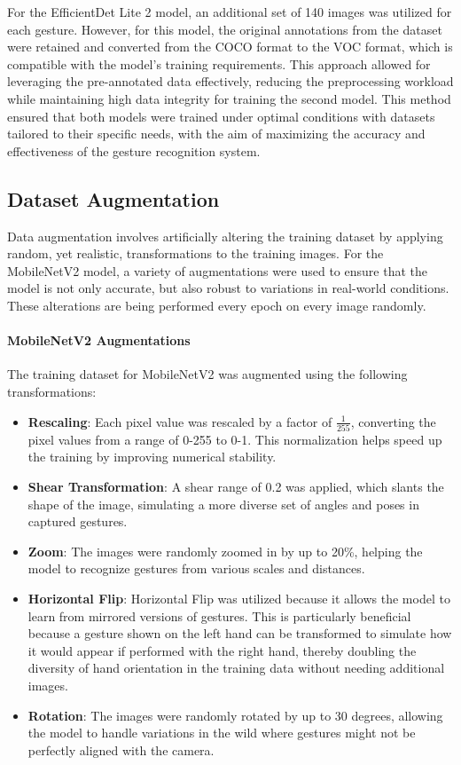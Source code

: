For the EfficientDet Lite 2 model, an additional set of 140 images was utilized for each gesture. However, for this model, the original annotations from the dataset were retained and converted from the COCO format to the VOC format, which is compatible with the model's training requirements. This approach allowed for leveraging the pre-annotated data effectively, reducing the preprocessing workload while maintaining high data integrity for training the second model. This method ensured that both models were trained under optimal conditions with datasets tailored to their specific needs, with the aim of maximizing the accuracy and effectiveness of the gesture recognition system.


\subsection{Dataset Augmentation}
Data augmentation involves artificially altering the training dataset by applying random, yet realistic, transformations to the training images. For the MobileNetV2 model, a variety of augmentations were used to ensure that the model is not only accurate, but also robust to variations in real-world conditions. These alterations are being performed every epoch on every image randomly.

\paragraph{MobileNetV2 Augmentations}
The training dataset for MobileNetV2 was augmented using the following transformations:
\begin{itemize}
    \item \textbf{Rescaling}: Each pixel value was rescaled by a factor of \(\frac{1}{255}\), converting the pixel values from a range of 0-255 to 0-1. This normalization helps speed up the training by improving numerical stability.
    \item \textbf{Shear Transformation}: A shear range of 0.2 was applied, which slants the shape of the image, simulating a more diverse set of angles and poses in captured gestures.
    \item \textbf{Zoom}: The images were randomly zoomed in by up to 20\%, helping the model to recognize gestures from various scales and distances.
    \item \textbf{Horizontal Flip}: Horizontal Flip was utilized because it allows the model to learn from mirrored versions of gestures. This is particularly beneficial because a gesture shown on the left hand can be transformed to simulate how it would appear if performed with the right hand, thereby doubling the diversity of hand orientation in the training data without needing additional images.
    \item \textbf{Rotation}: The images were randomly rotated by up to 30 degrees, allowing the model to handle variations in the wild where gestures might not be perfectly aligned with the camera.
\end{itemize}

